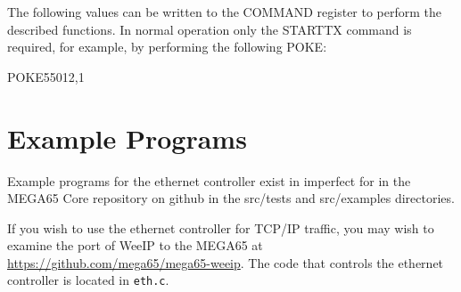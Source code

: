 The following values can be written to the COMMAND register to perform the described functions.
In normal operation only the STARTTX command is required, for example, by performing the following POKE:

\begin{screenoutput}
POKE55012,1
\end{screenoutput}



\section{Example Programs}

Example programs for the ethernet controller exist in imperfect for in the MEGA65 Core repository on github in the src/tests and src/examples directories.

If you wish to use the ethernet controller for TCP/IP traffic, you may wish to examine the port of WeeIP to the MEGA65 at
\url{https://github.com/mega65/mega65-weeip}.  The code that controls the ethernet controller is located in {\tt eth.c}.
